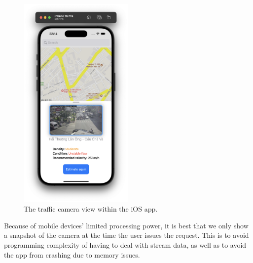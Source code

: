 \begin{figure}[H]
    \centering
    \includegraphics[width=0.5\textwidth]{assets/images/Implementation/hcmut_trafficview.png}
    \caption{The traffic camera view within the iOS app.}
    \label{fig:trafficview_ios}
\end{figure}

Because of mobile devices' limited processing power, it is best that we only show a snapshot of the camera at the time the user issues the request. This is to avoid programming complexity of having to deal with stream data, as well as to avoid the app from crashing due to memory issues.